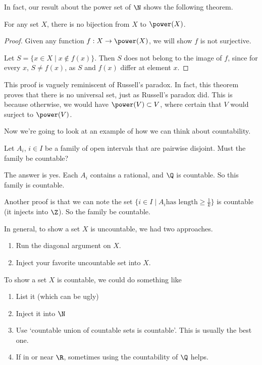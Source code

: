 
In fact, our result about the power set of $\N$ shows the following theorem.
\begin{theorem}
	For any set $X$, there is no bijection from $X$ to $\power(X)$.
\end{theorem}
\begin{proof}
	Given any function $f: X \rightarrow \power(X)$, we will show $f$ is not surjective.

	Let $S = \{x \in X \mid x \not \in f(x) \}$. Then $S$ does not belong to the image of $f$, since for every $x$, $S \neq f(x)$, as $S$ and $f(x)$ differ at element $x$.
\end{proof}

\begin{remark}
	This proof is vaguely reminiscent of Russell's paradox. In fact, this theorem proves that there is no universal set, just as Russell's paradox did. This is because otherwise, we would have $\power(V) \subset V$, where certain that $V$ would surject to $\power(V)$.
\end{remark}

Now we're going to look at an example of how we can think about countability.

\begin{example}
	Let $A_i$, $i \in I$ be a family of open intervals that are pairwise disjoint. Must the family be countable?

	The answer is yes. Each $A_i$ contains a rational, and $\Q$ is countable. So this family is countable. 

	Another proof is that we can note the set $\{i \in I \mid A_i \text{has length} \geq \frac{1}{k} \}$ is countable (it injects into $\Z$). So the family be countable.
\end{example}

In general, to show a set $X$ is uncountable, we had two approaches.
\begin{enumerate}
	\item Run the diagonal argument on $X$.
	\item Inject your favorite uncountable set into $X$.
\end{enumerate}
To show a set $X$ is countable, we could do something like
\begin{enumerate}
	\item List it (which can be ugly)
	\item Inject it into $\N$
	\item Use `countable union of countable sets is countable'. This is usually the best one.
	\item If in or near $\R$, sometimes using the countability of $\Q$ helps.
\end{enumerate}

